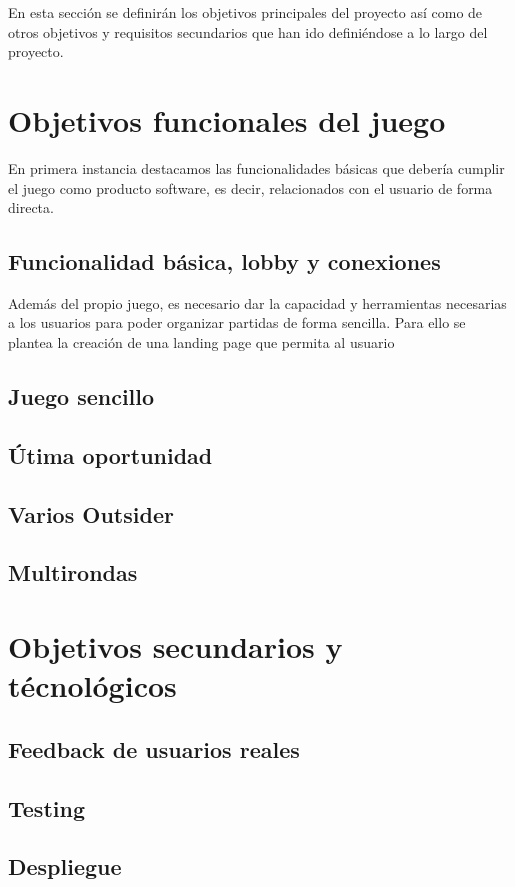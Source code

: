 En esta sección se definirán los objetivos principales del proyecto así como de otros objetivos y
requisitos secundarios que han ido definiéndose a lo largo del proyecto.

\section{Objetivos funcionales del juego}

En primera instancia destacamos las funcionalidades básicas que debería cumplir el juego como
producto software, es decir, relacionados con el usuario de forma directa.

\subsection{Funcionalidad básica, lobby y conexiones}

Además del propio juego, es necesario dar la capacidad y herramientas necesarias a los usuarios para 
poder organizar partidas de forma sencilla. Para ello se plantea la creación de una landing page que
permita al usuario




\subsection{Juego sencillo}

\subsection{Útima oportunidad}

\subsection{Varios Outsider}

\subsection{Multirondas}

\section{Objetivos secundarios y técnológicos}

\subsection{Feedback de usuarios reales}

\subsection{Testing}

\subsection{Despliegue}

